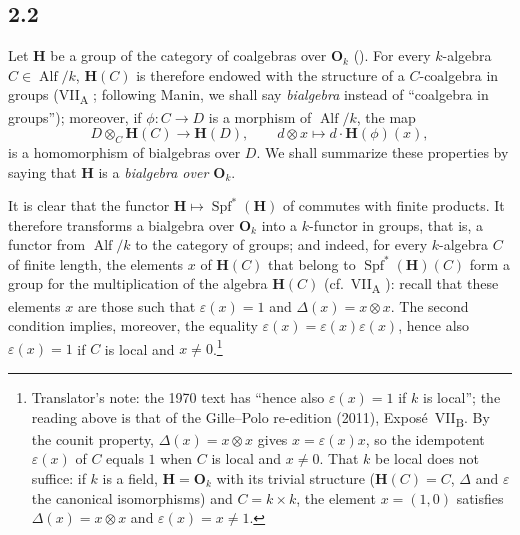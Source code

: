 
\subsection*{2.2}
\label{sga3:VIIB:2.2}

Let \(\mathbf H\) be a group of the category of coalgebras over
\(\mathbf O_k\) \textup{()}. For every \(k\)-algebra
\(C\in\operatorname{Alf}/k\), \(\mathbf H(C)\) is therefore endowed with
the structure of a \(C\)-coalgebra in groups \textup{(VII\textsubscript{A}
; following Manin, we shall say \emph{bialgebra} instead of
``coalgebra in groups'')}; moreover, if \(\phi:C\to D\) is a morphism of
\(\operatorname{Alf}/k\), the map
\[
  D\otimes_C\mathbf H(C)\longrightarrow\mathbf H(D),
  \qquad
  d\otimes x\longmapsto d\cdot\mathbf H(\phi)(x),
\]
is a homomorphism of bialgebras over \(D\). We shall summarize these
properties by saying that \(\mathbf H\) is a \emph{bialgebra over
\(\mathbf O_k\)}.

It is clear that the functor
\(\mathbf H\mapsto\operatorname{Spf}^*(\mathbf H)\) of 
commutes with finite products. It therefore transforms a bialgebra
over \(\mathbf O_k\) into a \(k\)-functor in groups, that is, a functor
from \(\operatorname{Alf}/k\) to the category of groups; and indeed,
for every \(k\)-algebra \(C\) of finite length, the elements \(x\) of
\(\mathbf H(C)\) that belong to \(\operatorname{Spf}^*(\mathbf H)(C)\)
form a group for the multiplication of the algebra \(\mathbf H(C)\)
\textup{(cf.\ VII\textsubscript{A} )}: recall that these elements \(x\)
are those such that \(\varepsilon(x)=1\) and \(\Delta(x)=x\otimes x\).
The second condition implies, moreover, the equality
\(\varepsilon(x)=\varepsilon(x)\varepsilon(x)\), hence also
\(\varepsilon(x)=1\) if \(C\) is local and \(x\neq0\).\footnote{Translator's note: the 1970 text has ``hence also
\(\varepsilon(x)=1\) if \(k\) is local''; the reading above is that of the
Gille--Polo re-edition (2011), Exposé~VII\textsubscript{B}. By the counit
property, \(\Delta(x)=x\otimes x\) gives \(x=\varepsilon(x)x\), so the
idempotent \(\varepsilon(x)\) of \(C\) equals \(1\) when \(C\) is local and
\(x\neq0\). That \(k\) be local does not suffice: if \(k\) is a field,
\(\mathbf H=\mathbf O_k\) with its trivial structure \textup{(}\(\mathbf H(C)=C\),
\(\Delta\) and \(\varepsilon\) the canonical isomorphisms\textup{)} and
\(C=k\times k\), the element \(x=(1,0)\) satisfies \(\Delta(x)=x\otimes x\)
and \(\varepsilon(x)=x\neq1\).}
